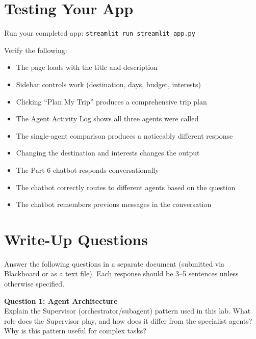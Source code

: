 \documentclass[11pt, letterpaper]{article}
\begin{document}
\section*{Testing Your App}

Run your completed app: \texttt{streamlit run streamlit\_app.py}

\medskip
\noindent Verify the following:
\begin{itemize}[nosep]
  \item[$\square$] The page loads with the title and description
  \item[$\square$] Sidebar controls work (destination, days, budget, interests)
  \item[$\square$] Clicking ``Plan My Trip'' produces a comprehensive trip plan
  \item[$\square$] The Agent Activity Log shows all three agents were called
  \item[$\square$] The single-agent comparison produces a noticeably different response
  \item[$\square$] Changing the destination and interests changes the output
  \item[$\square$] The Part 6 chatbot responds conversationally
  \item[$\square$] The chatbot correctly routes to different agents based on the question
  \item[$\square$] The chatbot remembers previous messages in the conversation
\end{itemize}

\newpage

\section*{Write-Up Questions}

Answer the following questions in a separate document (submitted via Blackboard or as a text file). Each response should be 3--5 sentences unless otherwise specified.

\bigskip

\noindent\textbf{Question 1: Agent Architecture}\\
Explain the Supervisor (orchestrator/subagent) pattern used in this lab. What role does the Supervisor play, and how does it differ from the specialist agents? Why is this pattern useful for complex tasks?
\end{document}
